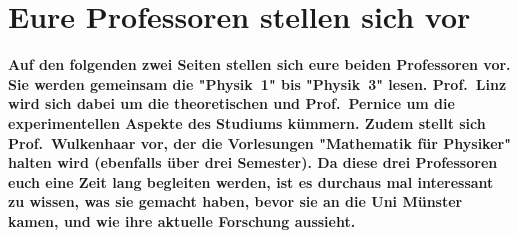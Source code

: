 \section{Eure Professoren stellen sich vor}
\textbf{Auf den folgenden zwei Seiten stellen sich eure beiden Professoren vor.
    Sie werden gemeinsam die "Physik~1" bis "Physik~3" lesen.
    Prof.\ Linz wird sich dabei um die theoretischen und Prof.\ Pernice um die experimentellen Aspekte des Studiums kümmern.
    Zudem stellt sich Prof.\ Wulkenhaar vor, der die Vorlesungen "Mathematik für Physiker" halten wird (ebenfalls über drei Semester).
	Da diese drei Professoren euch eine Zeit lang begleiten werden, ist es durchaus mal interessant zu wissen, was sie gemacht haben, bevor sie an die Uni Münster kamen, und wie ihre aktuelle Forschung aussieht.}

